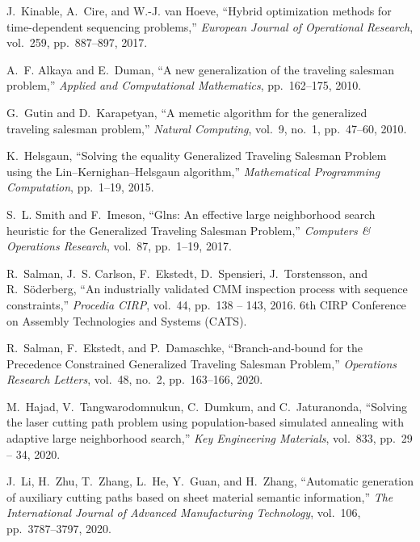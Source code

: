   \item
  J.~Kinable, A.~Cire, and W.-J. van Hoeve, ``Hybrid optimization methods for
    time-dependent sequencing problems,'' {\em European Journal of Operational
    Research}, vol.~259, pp.~887--897, 2017.

  \item
  A.~F. Alkaya and E.~Duman, ``A new generalization of the traveling salesman
    problem,'' {\em Applied and Computational Mathematics}, pp.~162--175, 2010.

  \item
  G.~Gutin and D.~Karapetyan, ``A memetic algorithm for the generalized traveling
    salesman problem,'' {\em Natural Computing}, vol.~9, no.~1, pp.~47--60, 2010.

  \item
  K.~Helsgaun, ``Solving the equality {G}eneralized {T}raveling {S}alesman
    {P}roblem using the {L}in--{K}ernighan--{H}elsgaun algorithm,'' {\em
    Mathematical Programming Computation}, pp.~1--19, 2015.

  \item
  S.~L. Smith and F.~Imeson, ``Glns: An effective large neighborhood search
    heuristic for the {G}eneralized {T}raveling {S}alesman {P}roblem,'' {\em
    Computers {\&} Operations Research}, vol.~87, pp.~1--19, 2017.

  \item
  R.~Salman, J.~S. Carlson, F.~Ekstedt, D.~Spensieri, J.~Torstensson, and
    R.~S\"{o}derberg, ``An industrially validated {CMM} inspection process with
    sequence constraints,'' {\em Procedia CIRP}, vol.~44, pp.~138 -- 143, 2016.
  \newblock 6th CIRP Conference on Assembly Technologies and Systems (CATS).

  \item
  R.~Salman, F.~Ekstedt, and P.~Damaschke, ``Branch-and-bound for the
    {P}recedence {C}onstrained {G}eneralized {T}raveling {S}alesman {P}roblem,''
    {\em Operations Research Letters}, vol.~48, no.~2, pp.~163--166, 2020.

  \item
  M.~Hajad, V.~Tangwarodomnukun, C.~Dumkum, and C.~Jaturanonda, ``Solving the
    laser cutting path problem using population-based simulated annealing with
    adaptive large neighborhood search,'' {\em Key Engineering Materials},
    vol.~833, pp.~29 -- 34, 2020.

  \item
  J.~Li, H.~Zhu, T.~Zhang, L.~He, Y.~Guan, and H.~Zhang, ``Automatic generation
    of auxiliary cutting paths based on sheet material semantic information,''
    {\em The International Journal of Advanced Manufacturing Technology},
    vol.~106, pp.~3787--3797, 2020.

